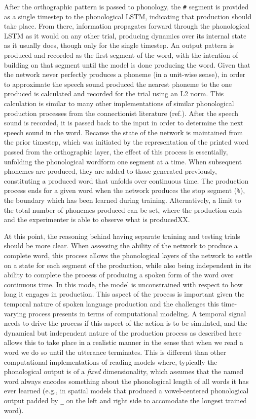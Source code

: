 \documentclass[
  american,
  man,floatsintext]{apa6}
\begin{document}
After the orthographic pattern is passed to phonology, the \texttt{\#} segment is provided as a single timestep to the phonological LSTM, indicating that production should take place. From there, information propagates forward through the phonological LSTM as it would on any other trial, producing dynamics over its internal state as it usually does, though only for the single timestep. An output pattern is produced and recorded as the first segment of the word, with the intention of building on that segment until the model is done producing the word. Given that the network never perfectly produces a phoneme (in a unit-wise sense), in order to approximate the speech sound produced the nearest phoneme to the one produced is calculated and recorded for the trial using an L2 norm. This calculation is similar to many other implementations of similar phonological production processes from the connectionist literature (ref.). After the speech sound is recorded, it is passed back to the input in order to determine the next speech sound in the word. Because the state of the network is maintained from the prior timestep, which was initiated by the representation of the printed word passed from the orthographic layer, the effect of this process is essentially, unfolding the phonological wordform one segment at a time. When subsequent phonemes are produced, they are added to those generated previously, constituting a produced word that unfolds over continuous time. The production process ends for a given word when the network produces the stop segment (\texttt{\%}), the boundary which has been learned during training. Alternatively, a limit to the total number of phonemes produced can be set, where the production ends and the experimenter is able to observe what is producedXX.

At this point, the reasoning behind having separate training and testing trials should be more clear. When assessing the ability of the network to produce a complete word, this process allows the phonological layers of the network to settle on a state for each segment of the production, while also being independent in its ability to complete the process of producing a spoken form of the word over continuous time. In this mode, the model is unconstrained with respect to how long it engages in production. This aspect of the process is important given the temporal nature of spoken language production and the challenges this time-varying process presents in terms of computational modeling. A temporal signal needs to drive the process if this aspect of the action is to be simulated, and the dynamical but independent nature of the production process as described here allows this to take place in a realistic manner in the sense that when we read a word we do so until the utterance terminates. This is different than other computational implementations of reading models where, typically the phonological output is of a \emph{fixed} dimensionality, which assumes that the named word always encodes something about the phonological length of all words it has ever learned (e.g., in spatial models that produced a vowel-centered phonological output padded by \texttt{\_} on the left and right side to accomodate the longest trained word).
\end{document}
